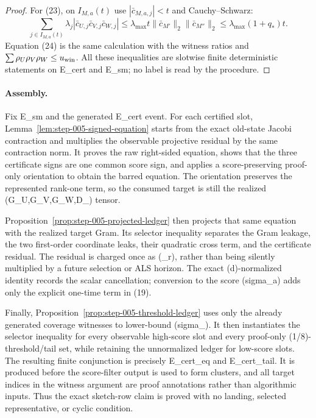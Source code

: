 \begin{proposition}
\begin{proof}
For (23), on $I_{M,a}(t)$ use $|\bar c_{M,a,j}|<t$ and Cauchy--Schwarz:
\[
\sum_{j\in I_{M,a}(t)}\lambda_j|\bar c_{U,j}\bar c_{V,j}\bar c_{W,j}|
\le\lambda_{\max}t\|\bar c_{M'}\|_2\|\bar c_{M''}\|_2
\le\lambda_{\max}(1+q_*)t.
\]
Equation (24) is the same calculation with the witness ratios and
$\sum\rho_U\rho_V\rho_W\le u_{\rm win}$. All these inequalities are
slotwise finite deterministic statements on E\_cert and E\_sm; no label is
read by the procedure. 

\end{proof}
\end{proposition}
\paragraph{Assembly.}

Fix E\_sm and the generated E\_cert event.  For each certified slot,
Lemma~\ref{lem:step-005-signed-equation} starts from the exact old-state
Jacobi contraction and multiplies the observable projective residual by the
same contraction norm.  It proves the raw right-sided equation, shows that
the three certificate signs are one common score sign, and applies a
score-preserving proof-only orientation to obtain the barred equation.  The
orientation preserves the represented rank-one term, so the consumed target is
still the realized (G\_U,G\_V,G\_W,D\_\lambda) tensor.

Proposition~\ref{prop:step-005-projected-ledger} then projects that same
equation with the realized target Gram.  Its selector inequality separates
the Gram leakage, the two first-order coordinate leaks, their quadratic cross
term, and the certificate residual.  The residual is charged once as
(\tau\_r), rather than being silently multiplied by a future
selection or ALS horizon.  The exact (d)-normalized identity records the
scalar cancellation; conversion to the score (sigma\_a) adds only the
explicit one-time term in (19).

Finally, Proposition~\ref{prop:step-005-threshold-ledger} uses only the
already generated coverage witnesses to lower-bound (sigma\_{\max}).  It
then instantiates the selector inequality for every observable high-score
slot and every proof-only (1/8)-threshold/tail set, while retaining the unnormalized
ledger for low-score slots.  The resulting finite conjunction is precisely
E\_cert\_eq and E\_cert\_tail.  It is produced before the score-filter output
is used to form clusters, and all target indices in the witness argument are
proof annotations rather than algorithmic inputs.  Thus the exact sketch-row
claim is proved with no landing, selected representative, or cyclic
condition.

